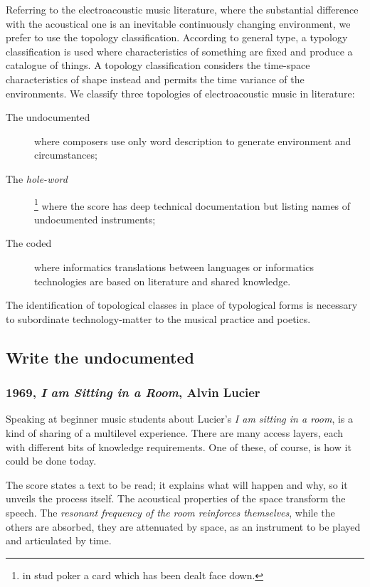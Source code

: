 Referring to the electroacoustic music literature, where the substantial difference with the acoustical one is an inevitable continuously changing environment, we prefer to use the topology classification. According to general type, a typology classification is used where characteristics of something are fixed and produce a catalogue of things. A topology classification considers the time-space characteristics of shape instead and permits the time variance of the environments. We classify three topologies of electroacoustic music in literature:

\begin{description}
  \item[The undocumented] where composers use only word description to generate environment and circumstances;
  \item[The \emph{hole-word}]\footnote{in stud poker a card which has been dealt
    face down.} where the score has deep technical documentation but listing names of undocumented instruments;
  \item[The coded] where informatics translations between languages or informatics technologies are based on literature and shared knowledge.
\end{description}

The identification of topological classes in place of typological forms is
necessary to subordinate technology-matter to the musical practice and poetics.

\subsection*{Write the undocumented}

\subsubsection*{1969, \emph{I am Sitting in a Room}, Alvin Lucier}

Speaking at beginner music students about Lucier's \emph{I am sitting in a room}, is a kind of sharing of a multilevel experience. There are many access layers, each with different bits of knowledge requirements. One of these, of course, is how it could be done today.

The score states a text to be read; it explains what will happen and why, so it unveils the process itself. The acoustical properties of the space transform the speech. The \emph{resonant frequency of the room reinforces themselves}, while the others are absorbed, they are attenuated by space, as an instrument to be played and articulated by time.

